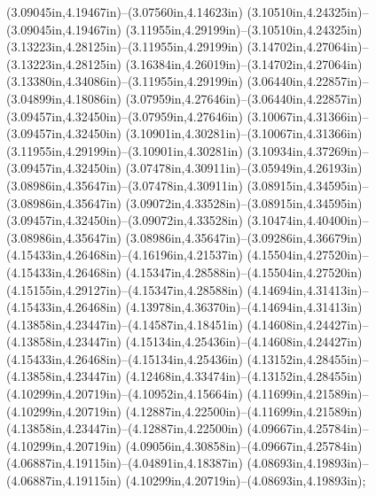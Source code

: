 (3.09045in,4.19467in)--(3.07560in,4.14623in) (3.10510in,4.24325in)--(3.09045in,4.19467in) (3.11955in,4.29199in)--(3.10510in,4.24325in) (3.13223in,4.28125in)--(3.11955in,4.29199in) (3.14702in,4.27064in)--(3.13223in,4.28125in) (3.16384in,4.26019in)--(3.14702in,4.27064in) (3.13380in,4.34086in)--(3.11955in,4.29199in) (3.06440in,4.22857in)--(3.04899in,4.18086in) (3.07959in,4.27646in)--(3.06440in,4.22857in) (3.09457in,4.32450in)--(3.07959in,4.27646in) (3.10067in,4.31366in)--(3.09457in,4.32450in) (3.10901in,4.30281in)--(3.10067in,4.31366in) (3.11955in,4.29199in)--(3.10901in,4.30281in) (3.10934in,4.37269in)--(3.09457in,4.32450in) (3.07478in,4.30911in)--(3.05949in,4.26193in) (3.08986in,4.35647in)--(3.07478in,4.30911in) (3.08915in,4.34595in)--(3.08986in,4.35647in) (3.09072in,4.33528in)--(3.08915in,4.34595in) (3.09457in,4.32450in)--(3.09072in,4.33528in) (3.10474in,4.40400in)--(3.08986in,4.35647in) (3.08986in,4.35647in)--(3.09286in,4.36679in) (4.15433in,4.26468in)--(4.16196in,4.21537in) (4.15504in,4.27520in)--(4.15433in,4.26468in) (4.15347in,4.28588in)--(4.15504in,4.27520in) (4.15155in,4.29127in)--(4.15347in,4.28588in) (4.14694in,4.31413in)--(4.15433in,4.26468in) (4.13978in,4.36370in)--(4.14694in,4.31413in) (4.13858in,4.23447in)--(4.14587in,4.18451in) (4.14608in,4.24427in)--(4.13858in,4.23447in) (4.15134in,4.25436in)--(4.14608in,4.24427in) (4.15433in,4.26468in)--(4.15134in,4.25436in) (4.13152in,4.28455in)--(4.13858in,4.23447in) (4.12468in,4.33474in)--(4.13152in,4.28455in) (4.10299in,4.20719in)--(4.10952in,4.15664in) (4.11699in,4.21589in)--(4.10299in,4.20719in) (4.12887in,4.22500in)--(4.11699in,4.21589in) (4.13858in,4.23447in)--(4.12887in,4.22500in) (4.09667in,4.25784in)--(4.10299in,4.20719in) (4.09056in,4.30858in)--(4.09667in,4.25784in) (4.06887in,4.19115in)--(4.04891in,4.18387in) (4.08693in,4.19893in)--(4.06887in,4.19115in) (4.10299in,4.20719in)--(4.08693in,4.19893in);
